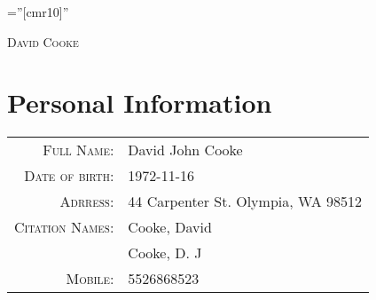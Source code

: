 \documentclass [a4paper,10pt]{article}
\begin{document}
\pagestyle{empty} %

\font\fb=''[cmr10]'' %

\par{\centering
		{\Huge   \textsc{David Cooke}
	}\bigskip\par}


\section{Personal Information}

\begin{tabular}{rl}
    \textsc{Full Name:} & David John Cooke \\
    \textsc{Date of birth:} & 1972-11-16 \\
    \textsc{Adrress:}   & 44 Carpenter St.
    Olympia, WA 98512\\
    \textsc{Citation Names:}   & Cooke, David \\ & Cooke, D. J \\ 
    \textsc{Mobile:}     & 5526868523\\
\end{tabular}
\end{document}
